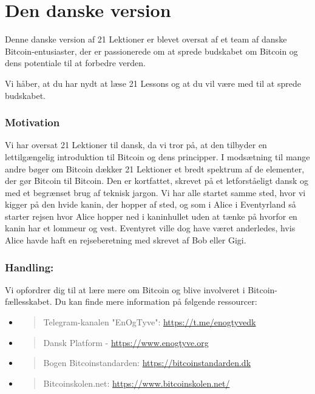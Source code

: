 %
\part{Den danske version}

Denne danske version af 21 Lektioner er blevet oversat af et team af
danske Bitcoin-entusiaster, der er passionerede om at sprede budskabet
om Bitcoin og dens potentiale til at forbedre verden.

Vi håber, at du har nydt at læse 21 Lessons og at du vil være med til at
sprede budskabet.

\section*{Motivation}

Vi har oversat 21 Lektioner til dansk, da vi tror på, at den tilbyder en
lettilgængelig introduktion til Bitcoin og dens principper. I modsætning
til mange andre bøger om Bitcoin dækker 21 Lektioner et bredt spektrum
af de elementer, der gør Bitcoin til Bitcoin. Den er kortfattet, skrevet
på et letforståeligt dansk og med et begrænset brug af teknisk jargon.
Vi har alle startet samme sted, hvor vi kigger på den hvide kanin, der
hopper af sted, og som i Alice i Eventyrland så starter rejsen hvor
Alice hopper ned i kaninhullet uden at tænke på hvorfor en kanin har et
lommeur og vest. Eventyret ville dog have været anderledes, hvis Alice
havde haft en rejseberetning med skrevet af Bob eller Gigi.
\newpage
\section*{Handling:}

Vi opfordrer dig til at lære mere om Bitcoin og blive involveret i
Bitcoin-fællesskabet. Du kan finde mere information på følgende
ressourcer:

\begin{itemize}
\item
  \begin{quote}
  Telegram-kanalen "EnOgTyve":
  \href{https://t.me/enogtyvedk}{https://t.me/enogtyvedk}
  \end{quote}
\item
  \begin{quote}
  Dansk Platform -
  \href{https://www.enogtyve.org/}{https://www.enogtyve.org}
  \end{quote}
\item
  \begin{quote}
  Bogen Bitcoinstandarden:
  \href{https://www.bitcoinstandarden.dk/}{https://bitcoinstandarden.dk}
  \end{quote}
\item
  \begin{quote}
  Bitcoinskolen.net:
  \href{https://www.bitcoinskolen.net/}{https://www.bitcoinskolen.net/}
  \end{quote}
\end{itemize}

